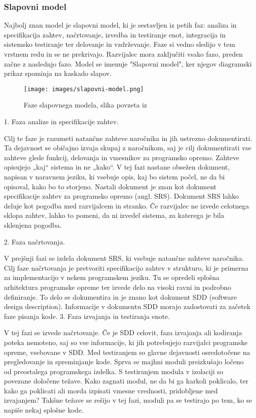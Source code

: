 \documentclass[a4paper,12pt,openright]{book}
\begin{document}
\subsubsection{Slapovni model}
Najbolj znan model je slapovni model, ki je sestavljen iz petih faz: analiza in specifikacija zahtev, načrtovanje, izvedba in testiranje enot, integracija in sistemsko testiranje ter delovanje in vzdrževanje. 
Faze si vedno sledijo v tem vrstnem redu in se ne prekrivajo. Razvijalec mora zaključiti vsako fazo, preden začne z naslednjo fazo. Model se imenuje "Slapovni model", ker njegov diagramski prikaz spominja na kaskado slapov.

\begin{figure}[H]
    \centering
    \texttt{[image: images/slapovni-model.png]}
    \caption{Faze slapovnega modela, slika povzeta iz \cite{mercun2012}}
    \label{fig:enter-label}
\end{figure}

1. Faza analize in specifikacije zahtev.

Cilj te faze je razumeti natančne zahteve naročnika in jih ustrezno dokumentirati. Ta dejavnost se običajno izvaja skupaj z naročnikom, saj je cilj dokumentirati vse zahteve glede funkcij, delovanja in vmesnikov za programsko opremo. Zahteve opisujejo „kaj“ sistema in ne „kako“. V tej fazi nastane obsežen dokument, napisan v naravnem jeziku, ki vsebuje opis, kaj bo sistem počel, ne da bi opisoval, kako bo to storjeno. Nastali dokument je znan kot dokument specifikacije zahtev za programsko opremo (angl. SRS). Dokument SRS lahko deluje kot pogodba med razvijalcem in stranko. Če razvijalec ne izvede celotnega sklopa zahtev, lahko to pomeni, da ni izvedel sistema, za katerega je bila sklenjena pogodba.


2. Faza načrtovanja.

 V prejšnji fazi se izdela dokument SRS, ki vsebuje natančne zahteve naročnika. Cilj faze načrtovanja je pretvoriti specifikacijo zahtev v strukturo, ki je primerna za implementacijo v nekem programskem jeziku. Tu se opredeli splošna arhitektura programske opreme ter izvede delo na visoki ravni in podrobno deﬁniranje. To delo se dokumentira in je znano kot dokument SDD (software design description). Informacije v dokumentu SDD morajo zadostovati za začetek faze pisanja kode.
3. Faza izvajanja in testiranja enote.

V tej fazi se izvede načrtovanje. Če je SDD celovit, faza izvajanja ali kodiranja poteka nemoteno, saj so vse informacije, ki jih potrebujejo razvijalci programske opreme, vsebovane v SDD.
Med testiranjem so glavne dejavnosti osredotočene na pregledovanje in spreminjanje kode. Sprva se majhni moduli preizkušajo ločeno od preostalega programskega izdelka. S testiranjem modula v izolaciji so povezane določene težave. Kako zagnati modul, ne da bi ga karkoli poklicalo, ter kako ga poklicati ali morda izpisati vmesne vrednosti, pridobljene med izvajanjem? Takšne težave se rešijo v tej fazi, moduli pa se testirajo po tem, ko se napiše nekaj splošne kode.
\end{document}
